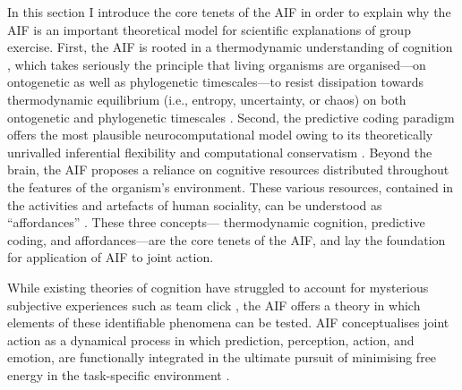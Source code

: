 \begin{CJK}{UTF8}{gbsn}
In this section I introduce the core tenets of the AIF in order to explain why the AIF is an important theoretical model for scientific explanations of group exercise.  First, the AIF is rooted in a thermodynamic understanding of cognition \citep{Yufik2017}, which takes seriously the principle that living organisms are organised---on ontogenetic as well as phylogenetic timescales---to resist dissipation towards thermodynamic equilibrium (i.e., entropy, uncertainty, or chaos) on both ontogenetic and phylogenetic timescales \citep[see][]{Friston2010,Yufik2002,Sengupta2016,Linson2018}. Second,  the predictive coding paradigm \citep[cf.][]{Rao1999,Clark2013} offers the most plausible neurocomputational model owing to its theoretically unrivalled inferential flexibility and computational conservatism \citep{Friston2006}.  Beyond the brain, the AIF proposes a reliance on cognitive resources distributed throughout the features of the organism's environment. These various resources, contained in the activities and artefacts of human sociality, can be understood as ``affordances'' \citep{Gibson1979,Ramstead2016,Bruineberg2014}. These three concepts--- thermodynamic cognition, predictive coding, and affordances---are the core tenets of the AIF, and lay the foundation for application of AIF to joint action.

While existing theories of cognition have struggled to account for mysterious subjective experiences such as team click \citep{Dietrich2004,Slingerland2014}, the AIF offers a theory in which elements of these identifiable phenomena can be tested.  AIF conceptualises joint action as a dynamical process in which prediction, perception, action, and emotion, are functionally integrated in the ultimate pursuit of minimising free energy in the task-specific environment \citep{Clark2015}.



\end{CJK}
